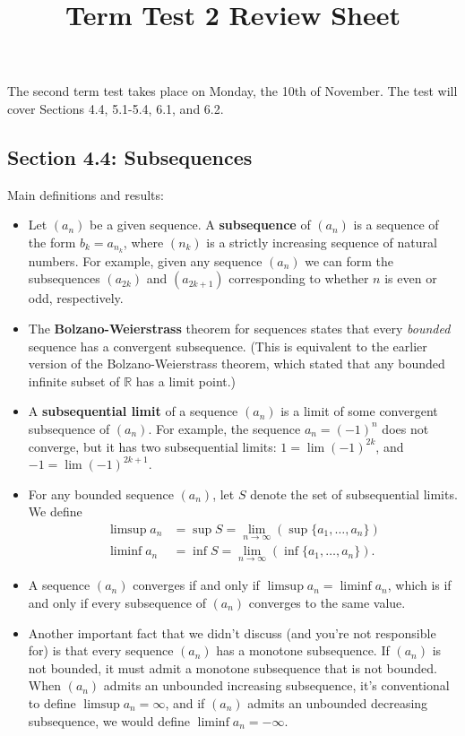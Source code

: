 \documentclass[letterpaper,12pt]{article}
\title{Term Test 2 Review Sheet}
\newcommand{\R}{\mathbb{R}}
\begin{document}
\maketitle

The second term test takes place on Monday, the 10th of November. The test will cover Sections 4.4, 5.1-5.4, 6.1, and 6.2.

\subsection*{Section 4.4: Subsequences}
Main definitions and results:
\begin{itemize}
 \item Let $(a_n)$ be a given sequence. A {\bf subsequence} of $(a_n)$ is a sequence of the form $b_k = a_{n_k}$, where $(n_k)$ is a strictly increasing sequence of natural numbers. For example, given any sequence $(a_n)$ we can form the subsequences $(a_{2k})$ and $(a_{2k+1})$ corresponding to whether $n$ is even or odd, respectively.
 \item The {\bf Bolzano-Weierstrass} theorem for sequences states that every {\em bounded} sequence has a convergent subsequence. (This is equivalent to the earlier version of the Bolzano-Weierstrass theorem, which stated that any bounded infinite subset of $\R$ has a limit point.)
 \item A {\bf subsequential limit} of a sequence $(a_n)$ is a limit of some convergent subsequence of $(a_n)$. For example, the sequence $a_n = (-1)^n$ does not converge, but it has two subsequential limits: $1=\lim (-1)^{2k}$, and $-1=\lim (-1)^{2k+1}$.
 \item For any bounded sequence $(a_n)$, let $S$ denote the set of subsequential limits. We define
\begin{align*}
 \limsup a_n & = \sup S = \lim_{n\to\infty}\left(\sup\{a_1,\ldots, a_n\}\right)\\
 \liminf a_n & = \inf S = \lim_{n\to\infty}\left(\inf\{a_1,\ldots, a_n\}\right).
\end{align*}
 \item A sequence $(a_n)$ converges if and only if $\limsup a_n=\liminf a_n$, which is if and only if every subsequence of $(a_n)$ converges to the same value.
 \item Another important fact that we didn't discuss (and you're not responsible for) is that every sequence $(a_n)$ has a monotone subsequence. If $(a_n)$ is not bounded, it must admit a monotone subsequence that is not bounded. When $(a_n)$ admits an unbounded increasing subsequence, it's conventional to define $\limsup a_n = \infty$, and if $(a_n)$ admits an unbounded decreasing subsequence, we would define $\liminf a_n = -\infty$.
\end{itemize}
\end{document}
